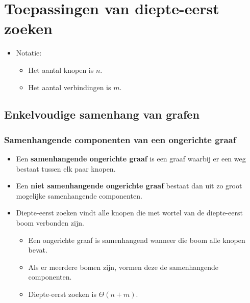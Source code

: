 \chapter{Toepassingen van diepte-eerst zoeken}
\begin{itemize}
	\item Notatie:
	\begin{itemize}
		\item Het aantal knopen is $n$.
		\item Het aantal verbindingen is $m$.
	\end{itemize}
\end{itemize}
\section{Enkelvoudige samenhang van grafen}
\subsection{Samenhangende componenten van een ongerichte graaf}
\begin{itemize}
	\item Een \textbf{samenhangende ongerichte graaf} is een graaf waarbij er een weg bestaat tussen elk paar knopen.
	\item Een \textbf{niet samenhangende ongerichte graaf} bestaat dan uit zo groot mogelijke samenhangende componenten.
	\item Diepte-eerst zoeken vindt alle knopen die met wortel van de diepte-eerst boom verbonden zijn.
	\begin{itemize}
		\item Een ongerichte graaf is samenhangend wanneer die boom alle knopen bevat.
		\item Als er meerdere bomen zijn, vormen deze de samenhangende componenten.
		\item Diepte-eerst zoeken is $\Theta(n + m)$.
	\end{itemize}
\end{itemize}

